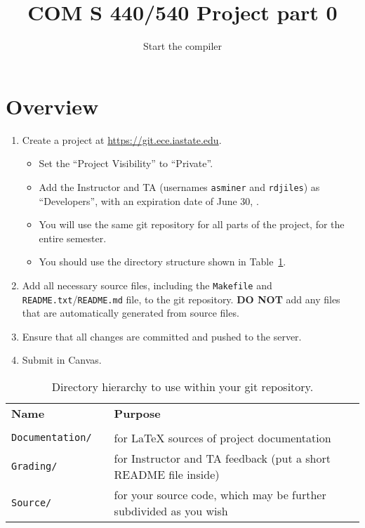 \documentclass{article}
\title{COM S 440/540 Project part 0}
\author{Start the compiler}
\date{}
\begin{document}
\maketitle

\section{Overview}

\begin{enumerate}
	\item
	Create a project at
	\url{https://git.ece.iastate.edu}.
	\begin{itemize}
		\item
    Set the ``Project Visibility'' to ``Private''.

		\item
    Add the Instructor and TA
			(usernames {\tt asminer} and {\tt rdjiles})
    as ``Developers'',
			with an expiration date of June 30, \the\year.

    \item
    You will use the same git repository for all parts of the project,
    for the entire semester.

		\item
		You should use the directory structure shown in Table~\ref{TAB:dirs}.

  \end{itemize}

	\item
	Add all necessary source files, including the {\tt Makefile}
	and {\tt README.txt}/{\tt README.md}  file, to the git repository.
	{\bf DO NOT} add any files that are automatically generated
	from source files.

	\item
	Ensure that all changes are committed and pushed to the server.

	\item
	Submit in Canvas.

\end{enumerate}

\begin{table}[t]
	\centering
		\begin{tabular}{lcl}
			{\bf Name} & & {\bf Purpose}
			\\ \cline{1-1} \cline{3-3}
			\\[-1.6ex]
			{\tt Documentation/} & & for \LaTeX{} sources of project documentation
			\\[.2ex]
			{\tt Grading/} & & for Instructor and TA feedback (put a short
													README file inside)
			\\[.2ex]
			{\tt Source/} & & for your source code, which may be further
												subdivided as you wish
		\end{tabular}
	\caption{Directory hierarchy to use within your git repository.}
	\label{TAB:dirs}
\end{table}
\end{document}
